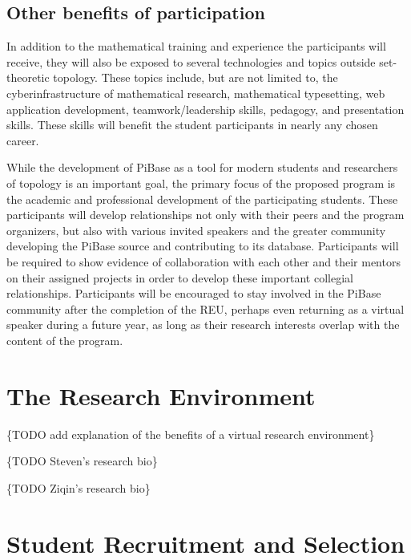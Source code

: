   \subsection{Other benefits of participation}

  In addition to the mathematical training and experience the participants will
  receive, they will also be exposed to several technologies and topics outside
  set-theoretic topology. These topics include, but are not limited to,
  the cyberinfrastructure of mathematical research, mathematical typesetting,
  web application development, teamwork/leadership skills, pedagogy,
  and presentation skills. These skills will benefit the student participants
  in nearly any chosen career.

  While the development of PiBase as a tool for modern students and researchers
  of topology is an important goal, the primary focus of the proposed program
  is the academic and professional development of the participating students.
  These participants will develop relationships not only with their peers
  and the program organizers, but also with various invited speakers and
  the greater community developing the PiBase source and contributing to its
  database. Participants will be
  required to show evidence of collaboration with
  each other and their mentors on their assigned projects in order
  to develop these important collegial relationships. Participants will be
  encouraged to stay involved in the PiBase community after the completion
  of the REU, perhaps even returning as a virtual speaker during a future year,
  as long as their research interests overlap with the content of the program.

\section{The Research Environment}

  \{TODO add explanation of the benefits of a virtual research environment\}

  \{TODO Steven's research bio\}

  \{TODO Ziqin's research bio\}

\section{Student Recruitment and Selection}

